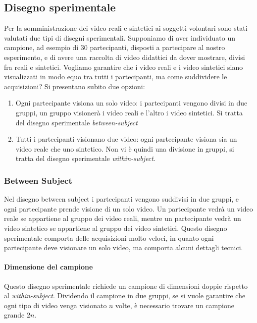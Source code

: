 \subsection{Disegno sperimentale}

Per la somministrazione dei video reali e sintetici ai soggetti volontari sono stati valutati due tipi di disegni sperimentali. Supponiamo di aver individuato un campione, ad esempio di 30 partecipanti, disposti a partecipare al nostro esperimento, e di avere una raccolta di video didattici da dover mostrare, divisi fra reali e sintetici. Vogliamo garantire che i video reali e i video sintetici siano  visualizzati in modo equo tra tutti i partecipanti, ma come suddividere le acquisizioni? Si presentano subito due opzioni:

\begin{enumerate}
    \item Ogni partecipante visiona un solo video: i partecipanti vengono divisi in due gruppi, un gruppo visionerà i video reali e l'altro i video sintetici. Si tratta del disegno sperimentale \textit{between-subject}
    \item Tutti i partecipanti visionano due video: ogni partecipante visiona sia un video reale che uno sintetico. Non vi è quindi una divisione in gruppi, si tratta del disegno sperimentale \textit{within-subject}. 
\end{enumerate}

\subsubsection{Between Subject}

Nel disegno between subject i partecipanti vengono suddivisi in due gruppi, e ogni partecipante prende visione di un solo video. Un partecipante vedrà un video reale se appartiene al gruppo dei video reali, mentre un partecipante vedrà un video sintetico se appartiene al gruppo dei video sintetici. Questo disegno sperimentale comporta delle acquisizioni molto veloci, in quanto ogni partecipante deve visionare un solo video, ma comporta alcuni dettagli tecnici.

\paragraph{Dimensione del campione} Questo disegno sperimentale richiede un campione di dimensioni doppie rispetto al \textit{within-subject}. Dividendo il campione in due gruppi, se si vuole garantire che ogni tipo di video venga visionato $n$ volte, è necessario trovare un campione grande $2n$.

